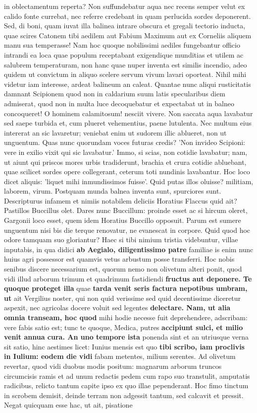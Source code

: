 in oblectamentum reperta? Non suffundebatur aqua nec recens semper velut ex calido fonte currebat, nec referre credebant in quam perlucida sordes deponerent. Sed, di boni, quam iuvat illa balinea intrare obscura et gregali tectorio inducta, quae scires Catonem tibi aedilem aut Fabium Maximum aut ex Corneliis aliquem manu sua temperasse! Nam hoc quoque nobilissimi aediles fungebantur officio intrandi ea loca quae populum receptabant exigendique munditias et utilem ac salubrem temperaturam, non hanc quae nuper inventa est similis incendio, adeo quidem ut convictum in aliquo scelere servum vivum lavari oporteat. Nihil mihi videtur iam interesse, ardeat balineum an caleat. Quantae nunc aliqui rusticitatis damnant Scipionem quod non in caldarium suum latis specularibus diem admiserat, quod non in multa luce decoquebatur et expectabat ut in balneo concoqueret! O hominem calamitosum! nesciit vivere. Non saccata aqua lavabatur sed saepe turbida et, cum plueret vehementius, paene lutulenta. Nec multum eius intererat an sic lavaretur; veniebat enim ut sudorem illic ablueret, non ut unguentum. Quas nunc quorundam voces futuras credis? 'Non invideo Scipioni: vere in exilio vixit qui sic lavabatur.' Immo, si scias, non cotidie lavabatur; nam, ut aiunt qui priscos mores urbis tradiderunt, brachia et crura cotidie abluebant, quae scilicet sordes opere collegerant, ceterum toti nundinis lavabantur. Hoc loco dicet aliquis: 'liquet mihi inmundissimos fuisse'. Quid putas illos oluisse? militiam, laborem, virum. Postquam munda balnea inventa sunt, spurciores sunt. Descripturus infamem et nimiis notabilem deliciis Horatius Flaccus quid ait? Pastillos Buccillus olet. Dares nunc Buccillum: proinde esset ac si hircum oleret, Gargonii loco esset, quem idem Horatius Buccillo opposuit. Parum est sumere unguentum nisi bis die terque renovatur, ne evanescat in corpore. Quid quod hoc odore tamquam suo gloriantur? Haec si tibi nimium tristia videbuntur, villae inputabis, in qua didici \textbf{ab Aegialo, diligentissimo patre} familiae is enim nunc huius agri possessor est quamvis vetus arbustum posse transferri. Hoc nobis senibus discere necessarium est, quorum nemo non olivetum alteri ponit, quod vidi illud arborum trimum et quadrimum fastidiendi \textbf{fructus aut deponere. Te quoque proteget illa} quae \textbf{\textbf{tarda venit seris factura nepotibus umbram,} ut} ait Vergilius noster, qui non quid verissime sed quid decentissime diceretur aspexit, nec agricolas docere voluit sed legentes \textbf{delectare. Nam, ut alia omnia transeam, hoc quod} mihi hodie necesse fuit deprehendere, adscribam: vere fabis satio est; tunc te quoque, Medica, putres \textbf{\textbf{accipiunt sulci, et milio \textbf{venit annua cura.} An} uno tempore ista} ponenda sint et an utriusque verna sit satio, hinc aestimes licet: Iunius mensis est quo \textbf{tibi \textbf{scribo, \textbf{iam \textbf{proclivis in Iulium: eodem}} die vidi}} fabam metentes, milium serentes. Ad olivetum revertar, quod vidi duobus modis positum: magnarum arborum truncos circumcisis ramis et ad unum redactis pedem cum rapo suo transtulit, amputatis radicibus, relicto tantum capite ipso ex quo illae pependerant. Hoc fimo tinctum in scrobem demisit, deinde terram non adgessit tantum, sed calcavit et pressit. Negat quicquam esse hac, ut ait, pisatione 